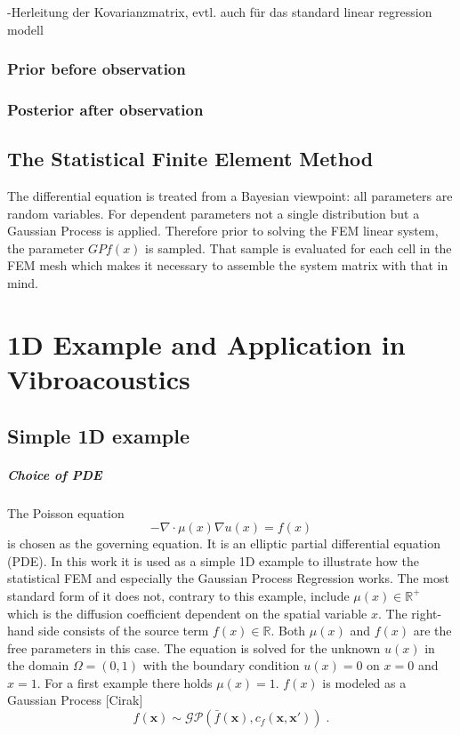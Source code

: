 \documentclass[%
  a4paper,oneside,%
  11pt,%
  smallchapters,
  green,%
  rgb, <cmyk>
  ,]{tubsbook}
\begin{document}
-Herleitung der Kovarianzmatrix, evtl. auch für das standard linear regression modell


\subsection{Prior before observation}

\subsection{Posterior after observation}

\section{The Statistical Finite Element Method}
The differential equation is treated from a Bayesian viewpoint: all parameters are random variables. For dependent parameters not a single distribution but a Gaussian Process is applied. Therefore prior to solving the FEM linear system, the parameter $GP f(x)$ is sampled. That sample is evaluated for each cell in the FEM mesh which makes it necessary to assemble the system matrix with that in mind.


\chapter{1D Example and Application in Vibroacoustics}

\section{Simple 1D example}
\paragraph{Choice of PDE}
The Poisson equation 
\begin{equation}
- \nabla \cdot \mu(x) \nabla u(x) = f(x)
\label{eqn:Poisson}
\end{equation}
is chosen as the governing equation. It is an elliptic partial differential equation (PDE). In this work it is used as a simple 1D example to illustrate how the statistical FEM and especially the Gaussian Process Regression works.
The most standard form of it does not, contrary to this example, include $\mu(x) \in \mathbb{R}^+$ which is the diffusion coefficient dependent on the spatial variable $x$. The right-hand side consists of the source term $f(x)\in \mathbb{R}$. Both $\mu (x)$ and $f(x)$ are the free parameters in this case. The equation is solved for the unknown  $u(x)$ in the domain $\Omega = (0,1)$ with the boundary condition $u(x) = 0$ on $x=0$ and $x=1$.
%
For a first example there holds $\mu(x)=1$. $f(x)$ is modeled as a Gaussian Process [Cirak]
%
\begin{equation}
f(\bm{x}) \sim \mathcal{GP} \left( \bar{f}(\bm{x}), c_f(\bm{x},\bm{x}')\right) \;.
\end{equation}
%
\end{document}
